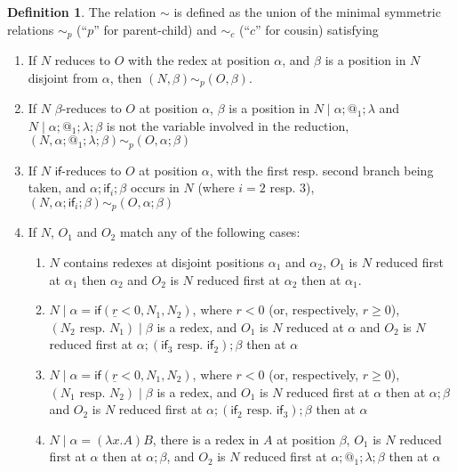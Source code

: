 \documentclass{article}
\newcommand{\tif}[3]{\mathsf{if}(#1, #2, #3)} %
\theoremstyle{definition}
\newtheorem{definition}{Definition}
\theoremstyle{lemma}
\theoremstyle{remark}
\begin{document}
\begin{definition}
The relation $\sim$ is defined as the union of the minimal symmetric relations $\sim_p$ (``$p$'' for parent-child) and $\sim_c$ (``$c$'' for cousin) satisfying
\begin{enumerate}
    \item If $N$ reduces to $O$ with the redex at position $\alpha$, and $\beta$ is a position in $N$ disjoint from $\alpha$, then $(N,\beta) \sim_p (O,\beta)$.
    
    \item If $N$ $\beta$-reduces to $O$ at position $\alpha$, $\beta$ is a position in $N \mid \alpha;@_1;\lambda$ and $N \mid \alpha;@_1;\lambda;\beta$ is not the variable involved in the reduction, $(N,\alpha;@_1;\lambda;\beta) \sim_p (O, \alpha;\beta)$
    
    \item If $N$ $\textsf{if}$-reduces to $O$ at position $\alpha$, with the first resp. second branch being taken, and $\alpha;\textsf{if}_i;\beta$ occurs in $N$ (where $i = 2$ resp. $3$), $(N,\alpha;\textsf{if}_i;\beta) \sim_p (O,\alpha;\beta)$
    
    \item If $N$, $O_1$ and $O_2$ match any of the following cases:
    \begin{enumerate}
        \item $N$ contains redexes at disjoint positions $\alpha_1$ and $\alpha_2$, $O_1$ is $N$ reduced first at $\alpha_1$ then $\alpha_2$ and $O_2$ is $N$ reduced first at $\alpha_2$ then at $\alpha_1$.
        
        \item $N \mid \alpha = \tif{\underline r < 0}{N_1}{N_2}$, where $r < 0$ (or, respectively, $r \geq 0$), $(N_2 \text{ resp. } N_1) \mid \beta$ is a redex, and $O_1$ is $N$ reduced at $\alpha$ and $O_2$ is $N$ reduced first at $\alpha;(\textsf{if}_3 \text{ resp. } \textsf{if}_2);\beta$ then at $\alpha$
        
        \item $N \mid \alpha = \tif{\underline r < 0}{N_1}{N_2}$, where $r < 0$ (or, respectively, $r \geq 0$), $(N_1 \text{ resp. } N_2) \mid \beta$ is a redex, and $O_1$ is $N$ reduced first at $\alpha$ then at $\alpha;\beta$ and $O_2$ is $N$ reduced first at $\alpha;(\textsf{if}_2 \text{ resp. } \textsf{if}_3);\beta$ then at $\alpha$
        
        \item $N \mid \alpha = (\lambda x. A) B$, there is a redex in $A$ at position $\beta$, $O_1$ is $N$ reduced first at $\alpha$ then at $\alpha;\beta$, and $O_2$ is $N$ reduced first at $\alpha;@_1;\lambda;\beta$ then at $\alpha$
        

\end{enumerate}
\end{enumerate}
\end{definition}
\end{document}
